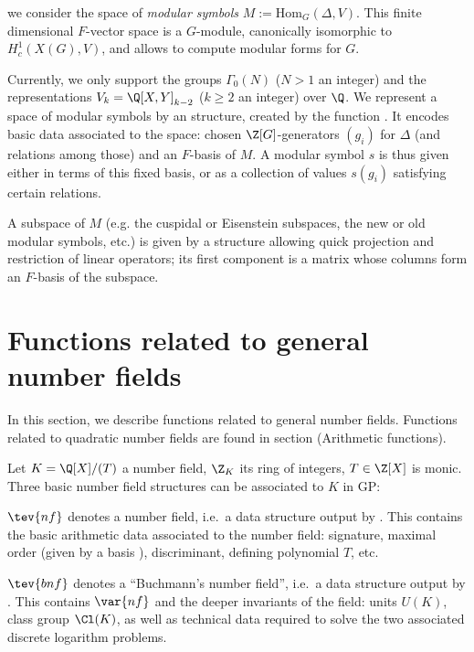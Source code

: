 \noindent we consider the space of \emph{modular symbols} $M :=
\text{Hom}_G(\Delta, V)$. This finite dimensional $F$-vector
space is a $G$-module, canonically isomorphic to $H^1_c(X(G), V)$,
and allows to compute modular forms for $G$.

Currently, we only support the groups $\Gamma_0(N)$ ($N > 1$ an integer)
and the representations $V_k = \Q[X,Y]_{k-2}$ ($k \geq 2$ an integer) over
$\Q$. We represent a space of modular symbols by an  structure,
created by the function . It encodes basic data associated to the
space: chosen $\Z[G]$-generators $(g_i)$ for $\Delta$ (and relations among
those) and an $F$-basis of $M$. A modular symbol $s$ is thus given either in
terms of this fixed basis, or as a collection of values $s(g_i)$
satisfying certain relations.

A subspace of $M$ (e.g. the cuspidal or Eisenstein subspaces, the new or
old modular symbols, etc.) is given by a structure allowing quick projection
and restriction of linear operators; its first component is a matrix whose
columns  form  an $F$-basis  of the subspace.


\section{Functions related to general number fields}

In this section, we describe functions related to general number fields.
Functions related to quadratic number fields are found in
section  (Arithmetic functions).


Let $K = \Q[X] / (T)$ a number field, $\Z_K$ its ring of integers, $T\in\Z[X]$
is monic. Three basic number field structures can be associated to $K$ in
GP:

\item $\tev{nf}$ denotes a number field, i.e.~a data structure output by
. This contains the basic arithmetic data associated to the
number field: signature, maximal order (given by a basis ),
discriminant, defining polynomial $T$, etc.

\item $\tev{bnf}$ denotes a ``Buchmann's number field'', i.e.~a
data structure output by . This contains
$\var{nf}$ and the deeper invariants of the field: units $U(K)$, class group
$\Cl(K)$, as well as technical data required to solve the two associated
discrete logarithm problems.

